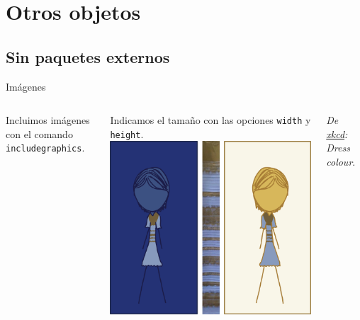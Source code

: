 \section{Otros objetos}

\subsection{Sin paquetes externos}

\begin{frame}{Imágenes}
  \begin{columns}
      Incluimos imágenes con el comando \texttt{includegraphics}.

      \espacio

      Indicamos el tamaño con las opciones \texttt{width} y \texttt{height}.
      \includegraphics[width=\textwidth]{./img/dress_color.png}
      \\
      \begin{center}
        {\footnotesize \textit{De \href{http://xkcd.com/1492}{xkcd}: Dress colour}.}
      \end{center}
  \end{columns}
\end{frame}

